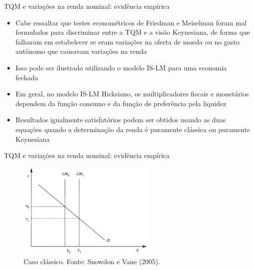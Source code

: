 \documentclass[10pt]{beamer}
\begin{document}
\begin{frame}{TQM e variações na renda nominal: evidência empírica}
    \begin{itemize}
        \item Cabe ressaltar que testes econométricos de Friedman e Meiselman foram mal formulados para discriminar entre a TQM e a visão Keynesiana, de forma que falharam em estabelecer se eram variações na oferta de moeda ou no gasto autônomo que causavam variações na renda
        \bigskip
        \item Isso pode ser ilustrado utilizando o modelo IS-LM para uma economia fechada
        \bigskip
        \item Em geral, no modelo IS-LM Hicksiano, os multiplicadores fiscais e monetários dependem da função consumo e da função de preferência pela liquidez
        \bigskip
        \item Resultados igualmente satisfatórios podem ser obtidos usando as duas equações quando a determinação da renda é puramente clássica ou puramente Keynesiana
    \end{itemize}
\end{frame}

\begin{frame}{TQM e variações na renda nominal: evidência empírica}
    \begin{figure}
        \centering
        \includegraphics[width=0.6\textwidth]{./figures/aula10_fig6.PNG}
        \caption{Caso clássico. Fonte: Snowdon e Vane (2005).}
        \label{fig6}
    \end{figure}
\end{frame}
\end{document}
